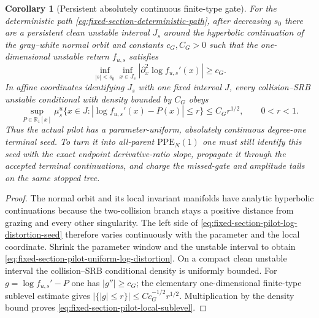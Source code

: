 \documentclass[11pt]{article}
\newtheorem{corollary}[theorem]{Corollary}
\begin{document}
\begin{corollary}[Persistent absolutely continuous finite-type gate]
\label{cor:fixed-section-pilot-finite-type-gate}
For the deterministic path
\eqref{eq:fixed-section-deterministic-path}, after decreasing $s_0$ there
are a persistent clean unstable interval $J_s$ around the hyperbolic
continuation of the gray--white normal orbit and constants $c_G,C_G>0$ such
that the one-dimensional unstable return $f_{u,s}$ satisfies
\begin{equation}
\label{eq:fixed-section-pilot-uniform-log-distortion}
 \inf_{|s|<s_0}\inf_{x\in J_s}
 \left|\partial_x^2\log f_{u,s}'(x)\right|\ge c_G.
\end{equation}
In affine coordinates identifying $J_s$ with one fixed interval $J$, every
collision--SRB unstable conditional with density bounded by $C_G$ obeys
\begin{equation}
\label{eq:fixed-section-pilot-local-sublevel}
 \sup_{P\in\mathbb R_1[x]}
 \mu_s^u\{x\in J:
   |\log f_{u,s}'(x)-P(x)|\le r\}
 \le C_G r^{1/2},
 \qquad 0<r<1.
\end{equation}
Thus the actual pilot has a parameter-uniform, absolutely continuous
degree-one terminal seed.  To turn it into all-parent
$\mathrm{PPE}_N(1)$ one must still identify this seed with the exact
endpoint derivative-ratio slope, propagate it through the accepted terminal
continuations, and charge the missed-gate and amplitude tails on the same
stopped tree.
\end{corollary}

\begin{proof}
The normal orbit and its local invariant manifolds have analytic hyperbolic
continuations because the two-collision branch stays a positive distance
from grazing and every other singularity.  The left side of
\eqref{eq:fixed-section-pilot-log-distortion-seed} therefore varies
continuously with the parameter and the local coordinate.  Shrink the
parameter window and the unstable interval to obtain
\eqref{eq:fixed-section-pilot-uniform-log-distortion}.  On a compact clean
unstable interval the collision--SRB conditional density is uniformly
bounded.  For $g=\log f_{u,s}'-P$ one has $|g''|\ge c_G$; the elementary
one-dimensional finite-type sublevel estimate gives
$|\{|g|\le r\}|\le Cc_G^{-1/2}r^{1/2}$.  Multiplication by the density bound
proves \eqref{eq:fixed-section-pilot-local-sublevel}.
\end{proof}
\end{document}
